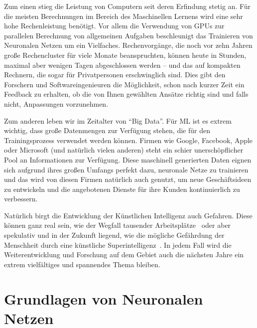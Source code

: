 Zum einen stieg die Leistung von Computern seit deren Erfindung stetig an. Für die meisten Berechnungen im Bereich des Maschinellen Lernens wird eine sehr hohe Rechenleistung benötigt. Vor allem die Verwendung von GPUs zur parallelen Berechnung von allgemeinen Aufgaben beschleunigt das Trainieren von Neuronalen Netzen um ein Vielfaches. Rechenvorgänge, die noch vor zehn Jahren große Rechencluster für viele Monate beanspruchten, können heute in Stunden, maximal aber wenigen Tagen abgeschlossen werden -- und das auf kompakten Rechnern, die sogar für Privatpersonen erschwinglich sind. Dies gibt den Forschern und Softwareingenieuren die Möglichkeit, schon nach kurzer Zeit ein Feedback zu erhalten, ob die von Ihnen gewählten Ansätze richtig sind und falls nicht, Anpassungen vorzunehmen.

Zum anderen leben wir im Zeitalter von "`Big Data"'. Für \gls{ML} ist es extrem wichtig, dass große Datenmengen zur Verfügung stehen, die für den Trainingsprozess verwendet werden können. Firmen wie Google, Facebook, Apple oder Microsoft (und natürlich vielen anderen) steht ein schier unerschöpflicher Pool an Informationen zur Verfügung. Diese maschinell generierten Daten eignen sich aufgrund ihres großen Umfangs perfekt dazu, neuronale Netze zu trainieren und das wird von diesen Firmen natürlich auch genutzt, um neue Geschäftsideen zu entwickeln und die angebotenen Dienste für ihre Kunden kontinuierlich zu verbessern.

Natürlich birgt die Entwicklung der Künstlichen Intelligenz auch Gefahren. Diese können ganz real sein, wie der Wegfall tausender Arbeitsplätze~\cite{Russell2015} oder aber spekulativ und in der Zukunft liegend, wie die mögliche Gefährdung der Menschheit durch eine künstliche Superintelligenz~\cite{Barrat2013}. In jedem Fall wird die Weiterentwicklung und Forschung auf dem Gebiet auch die nächsten Jahre ein extrem vielfältiges und spannendes Thema bleiben.

\section{Grundlagen von Neuronalen Netzen}
